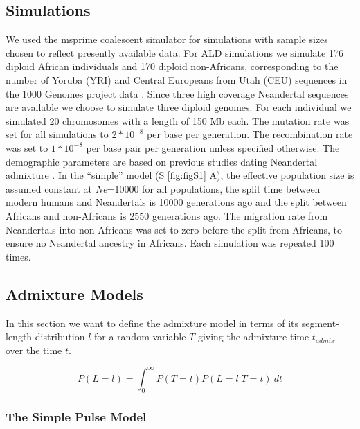 \documentclass[]{article}
\begin{document}
\subsection{Simulations}\label{simulations}

We used the msprime coalescent simulator
\citep{kelleher_efficient_2016} for simulations with sample sizes
chosen to reflect presently available data. For ALD simulations we simulate 176 diploid
African individuals and 170 diploid non-Africans, corresponding to the
number of Yoruba (YRI) and Central Europeans from Utah (CEU)
sequences in the 1000 Genomes project data \citep{the_1000_genomes_project_consortium_global_2015}. Since three
high coverage Neandertal sequences are available \citep{prufer_complete_2013,prufer_high-coverage_2017,mafessoni_high_coverage_2020} we choose to
simulate three diploid genomes. For each individual we simulated 20
chromosomes with a length of 150 Mb each. The mutation rate was set for
all simulations to \(2*10^{-8}\) per base per generation. The
recombination rate was set to \(1*10^{-8}\) per base pair per generation
unless specified otherwise. The demographic parameters are based on
previous studies dating Neandertal admixture
\citep{sankararaman_date_2012,fu_genome_2014,moorjani_genetic_2016}. In
the ``simple'' model (S \ref{fig:figS1} A), the effective
population size is assumed constant at \textit{Ne}=10000 for all populations, the
split time between modern humans and Neandertals is 10000 generations
ago and the split between Africans and non-Africans is 2550
generations ago. The migration rate from Neandertals into non-Africans
was set to zero before the split from Africans, to ensure no Neandertal
ancestry in Africans. Each simulation was repeated 100 times. 

\subsection{Admixture Models}\label{admixture models}

In this section we want to define the admixture model in terms of its segment-length distribution $l$ for a random variable $T$ giving the admixture time $t_{admix}$ over the time $t$. 


\begin{equation}
\label{eq:standard_likelihood_definintion}
    P(L=l)=\int_{0}^{\infty} P(T=t) P(L=l | T=t) \ dt
\end{equation}

\subsubsection{The Simple Pulse Model}\label{The Simple Pulse Model}
\end{document}
